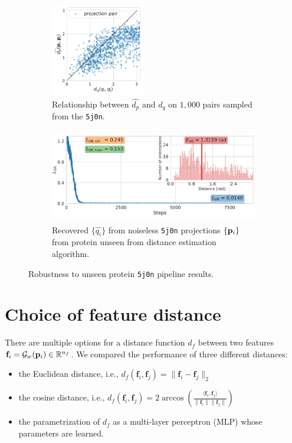 \begin{figure}[ht!]
    \centering
    \begin{subfigure}[b]{0.35\linewidth}
        \centering
        \includegraphics[height=11em]{figures/dPdQ_5j0n_robustness_to_unseen.pdf}
        \caption{Relationship between $\widehat{d_p}$ and $d_q$ on $1,000$ pairs sampled from the \texttt{5j0n}.}
    \end{subfigure}
    \hfill
    \begin{subfigure}[b]{0.55\linewidth}
        \centering
        \includegraphics[height=11em]{figures/5j0n_ar_aa_robustness_to_unseen.pdf}
        \caption{Recovered $\{ \widehat{q_i} \}$ from noiseless \texttt{5j0n} projections $\{ \mathbf{p}_i \}$ from protein unseen from distance estimation algorithm.}
    \end{subfigure}
    \caption{%
            Robustness to unseen protein \texttt{5j0n} pipeline results.
        }\label{fig:robustness-to-unseen-pipeline}
\end{figure}


\section{Choice of feature distance}\label{apx:feature-distance}


There are multiple options for a distance function $d_f$ between two features $\mathbf{f}_i = \mathcal{G}_w(\mathbf{p}_i) \in \mathbb{R}^{n_f}$. We compared the performance of three different distances:

\begin{itemize}
    \item the Euclidean distance, i.e., $d_f(\mathbf{f}_i, \mathbf{f}_j) = \| \mathbf{f}_i - \mathbf{f}_j \|_2$
    \item the cosine distance, i.e.,
$ d_f(\mathbf{f}_i,\mathbf{f}_j) = 2 \arccos \left( \frac{\langle \mathbf{f}_i, \mathbf{f}_j \rangle}{\lVert \mathbf{f}_i \rVert \lVert \mathbf{f}_j \rVert} \right)$
    \item the parametrization of $d_f$ as a multi-layer perceptron (MLP) whose parameters are learned.
\end{itemize}

